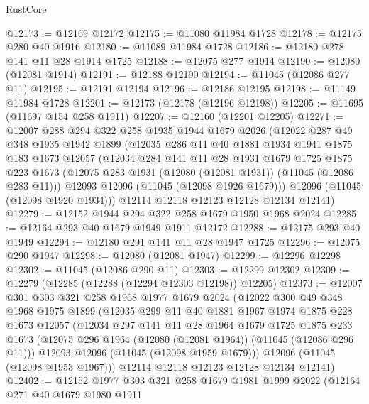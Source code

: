 \begin{lexlean}{RustCore}
\begin{coremodule}
@12173 := @12169 @12172
@12175 := @11080 @11984 @1728
@12178 := @12175 @280 @40 @1916
@12180 := @11089 @11984 @1728
@12186 := @12180 @278 @141 @11 @28 @1914 @1725
@12188 := @12075 @277 @1914
@12190 := @12080 (@12081 @1914)
@12191 := @12188 @12190
@12194 := @11045 (@12086 @277 @11)
@12195 := @12191 @12194
@12196 := @12186 @12195
@12198 := @11149 @11984 @1728
@12201 := @12173 (@12178 (@12196 @12198))
@12205 := @11695 (@11697 @154 @258 @1911)
@12207 := @12160 (@12201 @12205)
@12271 := @12007
    @288
    @294
    @322
    @258
    @1935
    @1944
    @1679
    @2026
    (@12022
      @287
      @49
      @348
      @1935
      @1942
      @1899
      (@12035
        @286
        @11
        @40
        @1881
        @1934
        @1941
        @1875
        @183
        @1673
        @12057
        (@12034
          @284
          @141
          @11
          @28
          @1931
          @1679
          @1725
          @1875
          @223
          @1673
          (@12075 @283 @1931 (@12080 (@12081 @1931)) (@11045 (@12086 @283 @11)))
          @12093
          @12096
          (@11045 (@12098 @1926 @1679)))
        @12096
        (@11045 (@12098 @1920 @1934)))
      @12114
      @12118
      @12123
      @12128
      @12134
      @12141)
@12279 := @12152 @1944 @294 @322 @258 @1679 @1950 @1968 @2024
@12285 := @12164 @293 @40 @1679 @1949 @1911 @12172
@12288 := @12175 @293 @40 @1949
@12294 := @12180 @291 @141 @11 @28 @1947 @1725
@12296 := @12075 @290 @1947
@12298 := @12080 (@12081 @1947)
@12299 := @12296 @12298
@12302 := @11045 (@12086 @290 @11)
@12303 := @12299 @12302
@12309 := @12279 (@12285 (@12288 (@12294 @12303 @12198)) @12205)
@12373 := @12007
    @301
    @303
    @321
    @258
    @1968
    @1977
    @1679
    @2024
    (@12022
      @300
      @49
      @348
      @1968
      @1975
      @1899
      (@12035
        @299
        @11
        @40
        @1881
        @1967
        @1974
        @1875
        @228
        @1673
        @12057
        (@12034
          @297
          @141
          @11
          @28
          @1964
          @1679
          @1725
          @1875
          @233
          @1673
          (@12075 @296 @1964 (@12080 (@12081 @1964)) (@11045 (@12086 @296 @11)))
          @12093
          @12096
          (@11045 (@12098 @1959 @1679)))
        @12096
        (@11045 (@12098 @1953 @1967)))
      @12114
      @12118
      @12123
      @12128
      @12134
      @12141)
@12402 := @12152
    @1977
    @303
    @321
    @258
    @1679
    @1981
    @1999
    @2022
    (@12164
      @271
      @40
      @1679
      @1980
      @1911

\end{coremodule}
\end{lexlean}
